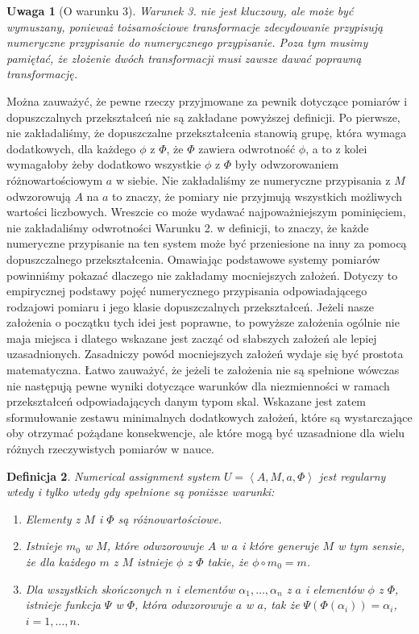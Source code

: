\documentclass[12pt,a4paper]{report}
\newtheorem{definition}{Definicja}[chapter]
\newtheorem{remark}[definition]{Uwaga}
\newcommand{\tuple}[1]{\left\langle {#1} \right\rangle}
\begin{document}
\begin{remark}[O warunku 3]
Warunek 3. nie jest kluczowy, ale może być wymuszany, ponieważ tożsamościowe transformacje zdecydowanie przypisują numeryczne przypisanie do numerycznego przypisanie. Poza tym musimy pamiętać, że złożenie dwóch transformacji musi zawsze dawać poprawną transformację.
\end{remark}

  Można zauważyć, że pewne rzeczy przyjmowane za pewnik dotyczące pomiarów i dopuszczalnych przekształceń nie są zakładane  powyższej definicji. Po pierwsze, nie zakładaliśmy, że dopuszczalne przekształcenia stanowią grupę, która wymaga dodatkowych, dla każdego $\phi$ z $\Phi$, że $\Phi$ zawiera odwrotność $\phi$, a to z kolei wymagałoby żeby dodatkowo wszystkie $\phi$ z $\Phi$ były odwzorowaniem różnowartościowym $a$ w siebie. Nie zakładaliśmy ze numeryczne przypisania z $M$ odwzorowują $A$ na $a$ to znaczy, że pomiary nie przyjmują wszystkich  możliwych wartości liczbowych. Wreszcie co może wydawać najpoważniejszym pominięciem, nie zakładaliśmy odwrotności Warunku 2. w definicji, to znaczy, że każde numeryczne przypisanie na ten system może być przeniesione na inny za pomocą dopuszczalnego przekształcenia. Omawiając podstawowe systemy pomiarów powinniśmy pokazać dlaczego nie zakładamy mocniejszych założeń. Dotyczy to empirycznej podstawy pojęć numerycznego przypisania odpowiadającego rodzajowi pomiaru i jego klasie dopuszczalnych przekształceń. Jeżeli nasze założenia o początku tych idei jest poprawne, to powyższe założenia ogólnie nie maja miejsca i dlatego wskazane jest zacząć od słabszych założeń ale lepiej uzasadnionych. Zasadniczy powód mocniejszych założeń wydaje się być prostota matematyczna. Łatwo zauważyć, że jeżeli te założenia nie są spełnione 
wówczas nie następują pewne wyniki dotyczące warunków dla niezmienności w ramach przekształceń odpowiadających danym typom skal. Wskazane jest zatem sformułowanie zestawu minimalnych dodatkowych założeń, które są wystarczające oby otrzymać pożądane konsekwencje, ale które mogą być uzasadnione dla wielu różnych rzeczywistych pomiarów w nauce.
\begin{definition}
Numerical assignment system $U=\tuple{A, M, a, \Phi}$ jest regularny wtedy i tylko wtedy gdy spełnione są poniższe warunki:
\begin{enumerate}
\item
Elementy z $M$ i $\Phi$ są różnowartościowe.
\item
Istnieje $m_{0}$ w $M$, które odwzorowuje $A$ w $a$ i które generuje $M$ w tym sensie, że dla każdego $m$ z $M$ istnieje $\phi$ z $\Phi$ takie, że $\phi \circ m_{0}=m$.
\item
Dla wszystkich skończonych $n$ i elementów $\alpha_{1},\dots,\alpha_{n}$ z $a$ i elementów $\phi$ z $\Phi$, istnieje funkcja $\Psi$ w $\Phi$, która odwzorowuje $a$ w $a$, tak że $\Psi(\Phi(\alpha_{i}))=\alpha_{i}$, $i=1,\ldots,n$.
\end{enumerate}
\end{definition}
\end{document}
